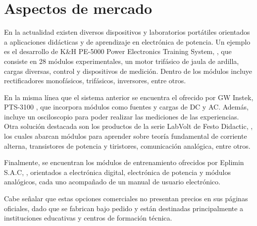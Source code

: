 \section{Aspectos de mercado}
\justifying

En la actualidad existen diversos dispositivos y laboratorios portátiles orientados a aplicaciones didácticas y de aprendizaje en electrónica de potencia. Un ejemplo es el desarrollo de K\&H PE-5000 Power Electronics Training System, \parencite{kandh-product}, que consiste en 28 módulos experimentales, un motor trifásico de jaula de ardilla, cargas diversas, control y dispositivos de medición. Dentro de los módulos incluye rectificadores monofásicos, trifásicos, inversores, entre otros. 

En la misma línea que el sistema anterior se encuentra el ofrecido por GW Instek, PTS-3100 \parencite{gwinstek-product}, que incorpora módulos como fuentes y cargas de DC y AC. Además, incluye un osciloscopio para poder realizar las mediciones de las experiencias. Otra solución destacada son los productos de la serie LabVolt de Festo Didactic, \parencite{festo-product}, los cuales abarcan módulos para aprender sobre teoría fundamental de corriente alterna, transistores de potencia y tiristores, comunicación analógica, entre otros.

Finalmente, se encuentran los módulos de entrenamiento ofrecidos por Eplimin S.A.C, \parencite{eplimin-product}, orientados a electrónica digital, electrónica de potencia y módulos analógicos, cada uno acompañado de un manual de usuario electrónico.

Cabe señalar que estas opciones comerciales no presentan precios en sus páginas oficiales, dado que se fabrican bajo pedido y están destinadas principalmente a instituciones educativas y centros de formación técnica.